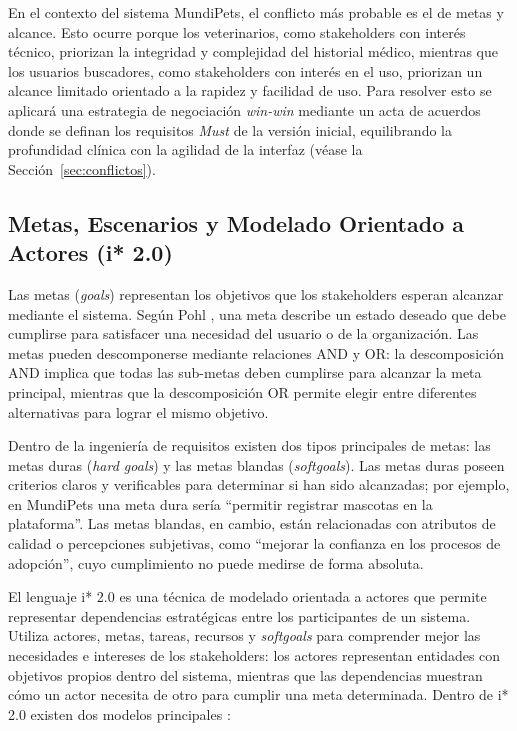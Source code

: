 \documentclass[journal,onecolumn]{IEEEtran}
\begin{document}
En el contexto del sistema MundiPets, el conflicto más probable es el de
metas y alcance. Esto ocurre porque los veterinarios, como stakeholders con
interés técnico, priorizan la integridad y complejidad del historial
médico, mientras que los usuarios buscadores, como stakeholders con interés
en el uso, priorizan un alcance limitado orientado a la rapidez y
facilidad de uso. Para resolver esto se aplicará una estrategia de
negociación \textit{win-win} mediante un acta de acuerdos donde se definan
los requisitos \textit{Must} de la versión inicial, equilibrando la
profundidad clínica con la agilidad de la interfaz (véase la
Sección~\ref{sec:conflictos}).

\newpage

\subsection{Metas, Escenarios y Modelado Orientado a Actores (i* 2.0)}

Las metas (\textit{goals}) representan los objetivos que los stakeholders
esperan alcanzar mediante el sistema. Según Pohl \cite{pohl2025}, una meta
describe un estado deseado que debe cumplirse para satisfacer una necesidad
del usuario o de la organización. Las metas pueden descomponerse mediante
relaciones AND y OR: la descomposición AND implica que todas las
sub-metas deben cumplirse para alcanzar la meta principal, mientras que la
descomposición OR permite elegir entre diferentes alternativas para lograr
el mismo objetivo.

Dentro de la ingeniería de requisitos existen dos tipos principales de
metas: las metas duras (\textit{hard goals}) y las metas blandas
(\textit{softgoals}). Las metas duras poseen criterios claros y verificables
para determinar si han sido alcanzadas; por ejemplo, en MundiPets una meta
dura sería ``permitir registrar mascotas en la plataforma''. Las metas
blandas, en cambio, están relacionadas con atributos de calidad o
percepciones subjetivas, como ``mejorar la confianza en los procesos de
adopción'', cuyo cumplimiento no puede medirse de forma absoluta.

El lenguaje i* 2.0 \cite{yu2011} es una técnica de modelado orientada a
actores que permite representar dependencias estratégicas entre los
participantes de un sistema. Utiliza actores, metas, tareas, recursos y
\textit{softgoals} para comprender mejor las necesidades e intereses de los
stakeholders: los actores representan entidades con objetivos propios
dentro del sistema, mientras que las dependencias muestran cómo un actor
necesita de otro para cumplir una meta determinada. Dentro de i* 2.0
existen dos modelos principales \cite{yu2011}:
\end{document}
